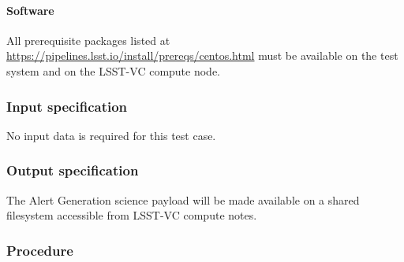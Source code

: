 \paragraph{Software}

All prerequisite packages listed at
\url{https://pipelines.lsst.io/install/prereqs/centos.html} must be available
on the test system and on the LSST-VC compute node.

\subsubsection{Input specification}

No input data is required for this test case.

\subsubsection{Output specification}

The Alert Generation science payload will be made available on a shared
filesystem accessible from LSST-VC compute notes.

\subsubsection{Procedure}

